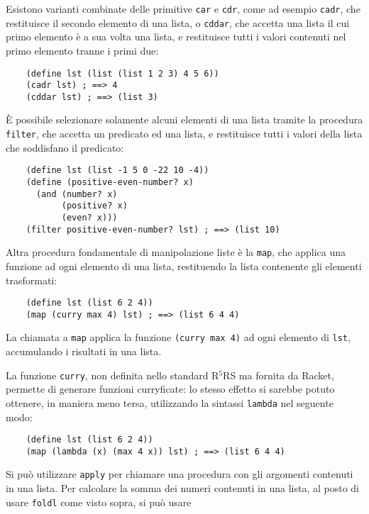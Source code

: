 Esistono varianti combinate delle primitive \lstinline{car} e
\lstinline{cdr}, come ad esempio \lstinline{cadr}, che restituisce il
secondo elemento di una lista, o \lstinline{cddar}, che accetta una lista
il cui primo elemento \`e a sua volta una lista, e restituisce tutti i
valori contenuti nel primo elemento tranne i primi due:

\begin{lstlisting}
    (define lst (list (list 1 2 3) 4 5 6))
    (cadr lst) ; ==> 4
    (cddar lst) ; ==> (list 3)
\end{lstlisting}

\`E possibile selezionare solamente alcuni elementi di una lista tramite
la procedura \lstinline{filter}, che accetta un predicato ed una lista, e
restituisce tutti i valori della lista che soddisfano il predicato:

\begin{lstlisting}
    (define lst (list -1 5 0 -22 10 -4))
    (define (positive-even-number? x)
      (and (number? x)
           (positive? x)
           (even? x)))
    (filter positive-even-number? lst) ; ==> (list 10)
\end{lstlisting}

Altra procedura fondamentale di manipolazione liste \`e la \lstinline{map},
che applica una funzione ad ogni elemento di una lista, restituendo la
lista contenente gli elementi trasformati:

\begin{lstlisting}
    (define lst (list 6 2 4))
    (map (curry max 4) lst) ; ==> (list 6 4 4)
\end{lstlisting}

La chiamata a \lstinline{map} applica la funzione \lstinline{(curry max 4)}
ad ogni elemento di \lstinline{lst}, accumulando i risultati in una lista.

La funzione \lstinline{curry}, non definita nello standard R$^{5}$RS ma
fornita da Racket, permette di generare funzioni curryficate: lo stesso
effetto si sarebbe potuto ottenere, in maniera meno tersa, utilizzando la
sintassi \lstinline{lambda} nel seguente modo:

\begin{lstlisting}
    (define lst (list 6 2 4))
    (map (lambda (x) (max 4 x)) lst) ; ==> (list 6 4 4)
\end{lstlisting}

Si pu\`o utilizzare \lstinline{apply} per chiamare una procedura con
gli argomenti contenuti in una lista. Per calcolare la somma dei
numeri contenuti in una lista, al posto di usare \lstinline{foldl}
come visto sopra, si pu\`o usare

